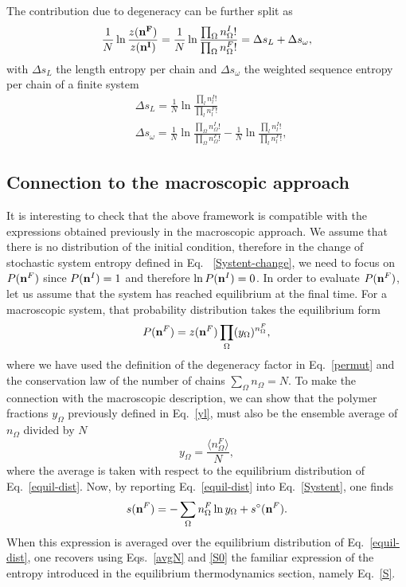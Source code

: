 \documentclass[
	amsmath,
	amssymb,
	a4paper,
	aip,		%
	jcp,		%
	reprint, twocolumn  %
	fleqn,
	showpacs,
	floatfix
]{revtex4-1}
\newcommand{\be}{\begin{equation}}
\newcommand{\ee}{\end{equation}}
\begin{document}
The contribution due to degeneracy can be further split as
\begin{equation}
	\begin{split}
\frac{1}{N} \ln \frac{z(\bold{n^{F}})}{z(\bold{n^{I}})}=\frac{1}{N} \ln \frac{ \prod_{\Omega} n^{I}_{\Omega}!  }{ \prod_{\Omega} n^{F}_{\Omega}!}  
= 
\Delta s_{L} + \Delta s_{\omega},
\end{split} 
\end{equation}
with $\Delta s_{L}$ the length entropy per chain and $\Delta s_{\omega}$ 
the weighted sequence entropy per chain of a finite system
 \begin{equation}
	\begin{split}
&\Delta s_{L} =\frac{1}{N} \ln \frac{\prod_{l} n^{I}_{l}! }{\prod_{l}n^{F}_{l}!} \\
&\Delta s_{\omega} =  \frac{1}{N} \ln \frac{\prod_{\Omega}n^{I}_{\Omega}! }{\prod_{\Omega}n^{F}_{\Omega}!} - \frac{1}{N} \ln \frac{\prod_{l} n^{I}_{l}! }{\prod_{l}n^{F}_{l}!},
\label{Stochentr4}
\end{split} 
\end{equation}

\subsection{Connection to the macroscopic approach}
It is interesting to check that the above framework is compatible 
with the expressions obtained previously in the macroscopic approach. 
We assume that there is no distribution of the initial condition, therefore 
in the change of stochastic system entropy defined in Eq. ~\eqref{Systent-change}, we need to 
focus on $P(\bold{n}^F)$ since $P(\bold{n}^I)=1$ and therefore $\ln P(\bold{n}^I)=0$. In order to evaluate $P(\bold{n}^F)$, 
let us assume that the system has reached equilibrium at the final time. 
For a macroscopic system, that probability distribution takes the equilibrium form 
\be
P(\bold{n}^F)=z(\bold{n}^F) \prod_\Omega (y_\Omega)^{n_{\Omega}^F},
\label{equil-dist}
\ee
where we have used the definition of the degeneracy factor in Eq.~\eqref{permut} 
and the conservation law of the number of chains $\sum_\Omega n_{\Omega}=N$.
To make the connection with the macroscopic description, we can show that the polymer fractions $y_{\Omega}$ 
previously defined in Eq.~\eqref{yl}, must also be the ensemble average of $n_{\Omega}$ divided by $N$
\be
y_\Omega=\frac{\langle n_{\Omega}^F \rangle}{N},
\ee
where the average is taken with respect to the equilibrium distribution of Eq.~\eqref{equil-dist}.
Now, by reporting Eq.~\eqref{equil-dist} into Eq.~\eqref{Systent}, 
one finds 
\be
s( \bold{n}^F)= - \sum_\Omega n_{\Omega}^F \ln y_\Omega + s^{\circ}(\bold{n}^F).
\ee
When this expression is averaged over the equilibrium distribution of Eq.~\eqref{equil-dist}, 
one recovers using Eqs.~\eqref{avgN} and \eqref{S0} the 
familiar expression of the entropy introduced in the equilibrium thermodynamics section, namely  
Eq.~\eqref{S}.
\end{document}
